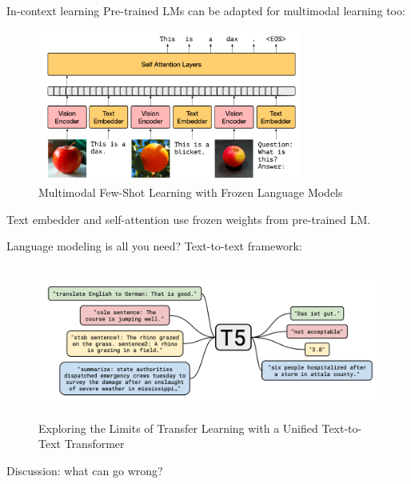 \documentclass[usenames,dvipsnames,11pt,aspectratio=169]{beamer}
\begin{document}
\begin{frame}
    {In-context learning}
    Pre-trained LMs can be adapted for multimodal learning too:
    \begin{figure}
            \includegraphics[height=5cm]{figures/in-context-multimodal}
            \caption{Multimodal Few-Shot Learning with Frozen Language Models}
    \end{figure}
    \vspace{-1em}
    Text embedder and self-attention use frozen weights from pre-trained LM.
\end{frame}

\begin{frame}
    {Language modeling is all you need?}
    Text-to-text framework:
    \begin{figure}
            \includegraphics[height=5cm]{figures/t5}
            \caption{Exploring the Limits of Transfer Learning with a Unified Text-to-Text Transformer}
    \end{figure}
\end{frame}

\begin{frame}
    {Discussion: what can go wrong?}
\end{frame}
\end{document}

